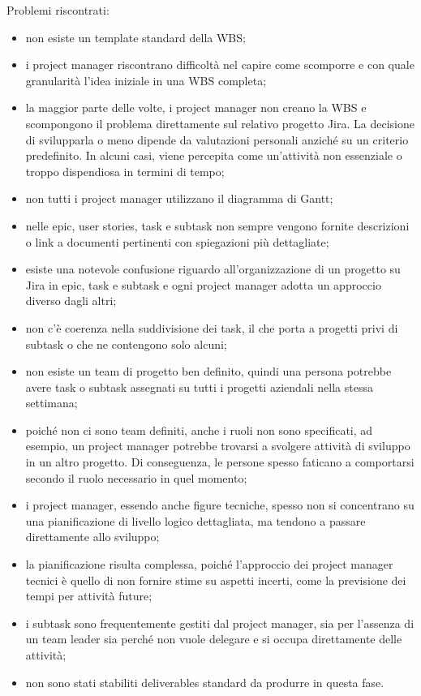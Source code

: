         Problemi riscontrati:
        \begin{itemize}
            \item non esiste un template standard della \ac{WBS};
            \item i project manager riscontrano difficoltà nel capire come scomporre e con quale granularità l’idea iniziale in una \ac{WBS} completa;
            \item la maggior parte delle volte, i project manager non creano la \ac{WBS} e scompongono il problema direttamente sul relativo progetto Jira. La
            decisione di svilupparla o meno dipende da valutazioni personali anziché su un criterio predefinito. In alcuni casi, viene percepita come un’attività
            non essenziale o troppo dispendiosa in termini di tempo;
            \item non tutti i project manager utilizzano il diagramma di Gantt;
            \item nelle epic, user stories, task e subtask non sempre vengono fornite descrizioni o link a documenti pertinenti con spiegazioni più dettagliate;
            \item esiste una notevole confusione riguardo all'organizzazione di un progetto su Jira in epic, task e subtask e
            ogni project manager adotta un approccio diverso dagli altri;
            \item non c'è coerenza nella suddivisione dei task, il che porta a progetti privi di subtask o che ne contengono solo alcuni;
            \item non esiste un team di progetto ben definito, quindi una persona potrebbe avere task o subtask assegnati su tutti i progetti aziendali nella stessa settimana;
            \item poiché non ci sono team definiti, anche i ruoli non sono specificati, ad esempio, un project manager potrebbe trovarsi a svolgere attività di sviluppo in un altro progetto.
            Di conseguenza, le persone spesso faticano a comportarsi secondo il ruolo necessario in quel momento;
            \item i project manager, essendo anche figure tecniche, spesso non si concentrano su una pianificazione di livello logico
            dettagliata, ma tendono a passare direttamente allo sviluppo;
            \item la pianificazione risulta complessa, poiché l’approccio dei project manager tecnici è quello di non fornire stime su aspetti incerti, come la previsione
            dei tempi per attività future;
            \item i subtask sono frequentemente gestiti dal project manager, sia per l'assenza di un team leader sia perché non vuole
            delegare e si occupa direttamente delle attività;
            \item non sono stati stabiliti deliverables standard da produrre in questa fase.
        \end{itemize}

